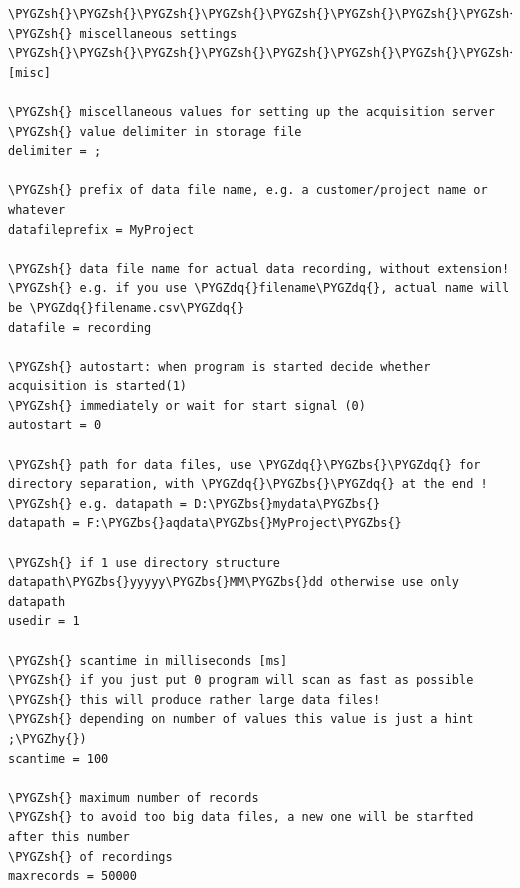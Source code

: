 \documentclass[a4paper,10pt,english]{sphinxmanual}
\def\PYGZbs{\char`\\}
\def\PYGZsh{\char`\#}
\def\PYGZhy{\char`\-}
\def\PYGZdq{\char`\"}
\begin{document}
\begin{Verbatim}[commandchars=\\\{\}]
\PYGZsh{}\PYGZsh{}\PYGZsh{}\PYGZsh{}\PYGZsh{}\PYGZsh{}\PYGZsh{}\PYGZsh{}\PYGZsh{}\PYGZsh{}\PYGZsh{}\PYGZsh{}\PYGZsh{}\PYGZsh{}\PYGZsh{}\PYGZsh{}\PYGZsh{}\PYGZsh{}\PYGZsh{}\PYGZsh{}\PYGZsh{}\PYGZsh{}\PYGZsh{}\PYGZsh{}\PYGZsh{}\PYGZsh{}\PYGZsh{}\PYGZsh{}\PYGZsh{}\PYGZsh{}\PYGZsh{}\PYGZsh{}\PYGZsh{}\PYGZsh{}\PYGZsh{}\PYGZsh{}\PYGZsh{}\PYGZsh{}\PYGZsh{}\PYGZsh{}\PYGZsh{}\PYGZsh{}\PYGZsh{}\PYGZsh{}\PYGZsh{}\PYGZsh{}\PYGZsh{}\PYGZsh{}\PYGZsh{}\PYGZsh{}\PYGZsh{}\PYGZsh{}\PYGZsh{}\PYGZsh{}\PYGZsh{}\PYGZsh{}\PYGZsh{}\PYGZsh{}\PYGZsh{}\PYGZsh{}\PYGZsh{}\PYGZsh{}\PYGZsh{}\PYGZsh{}\PYGZsh{}\PYGZsh{}\PYGZsh{}\PYGZsh{}\PYGZsh{}\PYGZsh{}\PYGZsh{}\PYGZsh{}
\PYGZsh{} miscellaneous settings
\PYGZsh{}\PYGZsh{}\PYGZsh{}\PYGZsh{}\PYGZsh{}\PYGZsh{}\PYGZsh{}\PYGZsh{}\PYGZsh{}\PYGZsh{}\PYGZsh{}\PYGZsh{}\PYGZsh{}\PYGZsh{}\PYGZsh{}\PYGZsh{}\PYGZsh{}\PYGZsh{}\PYGZsh{}\PYGZsh{}\PYGZsh{}\PYGZsh{}\PYGZsh{}\PYGZsh{}\PYGZsh{}\PYGZsh{}\PYGZsh{}\PYGZsh{}\PYGZsh{}\PYGZsh{}\PYGZsh{}\PYGZsh{}\PYGZsh{}\PYGZsh{}\PYGZsh{}\PYGZsh{}\PYGZsh{}\PYGZsh{}\PYGZsh{}\PYGZsh{}\PYGZsh{}\PYGZsh{}\PYGZsh{}\PYGZsh{}\PYGZsh{}\PYGZsh{}\PYGZsh{}\PYGZsh{}\PYGZsh{}\PYGZsh{}\PYGZsh{}\PYGZsh{}\PYGZsh{}\PYGZsh{}\PYGZsh{}\PYGZsh{}\PYGZsh{}\PYGZsh{}\PYGZsh{}\PYGZsh{}\PYGZsh{}\PYGZsh{}\PYGZsh{}\PYGZsh{}\PYGZsh{}\PYGZsh{}\PYGZsh{}\PYGZsh{}\PYGZsh{}\PYGZsh{}\PYGZsh{}\PYGZsh{}
[misc]

\PYGZsh{} miscellaneous values for setting up the acquisition server
\PYGZsh{} value delimiter in storage file
delimiter = ;

\PYGZsh{} prefix of data file name, e.g. a customer/project name or whatever
datafileprefix = MyProject

\PYGZsh{} data file name for actual data recording, without extension!
\PYGZsh{} e.g. if you use \PYGZdq{}filename\PYGZdq{}, actual name will be \PYGZdq{}filename.csv\PYGZdq{}
datafile = recording

\PYGZsh{} autostart: when program is started decide whether acquisition is started(1)
\PYGZsh{} immediately or wait for start signal (0)
autostart = 0

\PYGZsh{} path for data files, use \PYGZdq{}\PYGZbs{}\PYGZdq{} for directory separation, with \PYGZdq{}\PYGZbs{}\PYGZdq{} at the end !
\PYGZsh{} e.g. datapath = D:\PYGZbs{}mydata\PYGZbs{}
datapath = F:\PYGZbs{}aqdata\PYGZbs{}MyProject\PYGZbs{}

\PYGZsh{} if 1 use directory structure datapath\PYGZbs{}yyyyy\PYGZbs{}MM\PYGZbs{}dd otherwise use only datapath
usedir = 1

\PYGZsh{} scantime in milliseconds [ms]
\PYGZsh{} if you just put 0 program will scan as fast as possible
\PYGZsh{} this will produce rather large data files!
\PYGZsh{} depending on number of values this value is just a hint ;\PYGZhy{})
scantime = 100

\PYGZsh{} maximum number of records
\PYGZsh{} to avoid too big data files, a new one will be starfted after this number
\PYGZsh{} of recordings
maxrecords = 50000
\end{Verbatim}
\end{document}

